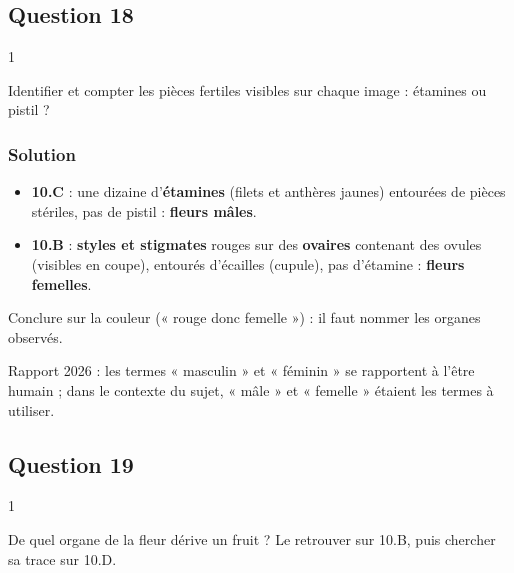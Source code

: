 \documentclass[11pt,a4paper]{article}
\providecommand{\tightlist}{\setlength{\itemsep}{0pt}\setlength{\parskip}{0pt}}
\begin{document}
\hypertarget{question-18}{%
\subsection{Question 18}\label{question-18}}

\begin{indication}{1}

Identifier et compter les pièces fertiles visibles sur chaque image : étamines ou pistil ?

\end{indication}

\hypertarget{solution-17}{%
\subsubsection{Solution}\label{solution-17}}

\begin{itemize}
\tightlist
\item
  \textbf{10.C} : une dizaine d'\textbf{étamines} (filets et anthères jaunes) entourées de pièces stériles, pas de pistil : \textbf{fleurs mâles}.
\item
  \textbf{10.B} : \textbf{styles et stigmates} rouges sur des \textbf{ovaires} contenant des ovules (visibles en coupe), entourés d'écailles (cupule), pas d'étamine : \textbf{fleurs femelles}.
\end{itemize}

\begin{piege}

Conclure sur la couleur (« rouge donc femelle ») : il faut nommer les organes observés.

\end{piege}

\begin{jury}

Rapport 2026 : les termes « masculin » et « féminin » se rapportent à l'être humain ; dans le contexte du sujet, « mâle » et « femelle » étaient les termes à utiliser.

\end{jury}

\hypertarget{question-19}{%
\subsection{Question 19}\label{question-19}}

\begin{indication}{1}

De quel organe de la fleur dérive un fruit ? Le retrouver sur 10.B, puis chercher sa trace sur 10.D.

\end{indication}
\end{document}
